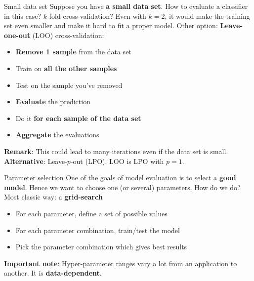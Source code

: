 \documentclass{beamer}
\newcommand{\1}[1]{\mathbbm{1}\left[#1\right]}
\begin{document}
\begin{frame}{Small data set}
Suppose you have \textbf{a small data set}. How to evaluate a classifier in this case?
\vfill
\pause
$k$-fold cross-validation? Even with $k = 2$, it would make the training set even smaller and make it hard to fit a proper model.
\vfill
\pause
Other option: \textbf{Leave-one-out} (LOO) cross-validation:
\pause
\begin{itemize}
	\item \textbf{Remove 1 sample} from the data set
	\item Train on \textbf{all the other samples}
	\item Test on the sample you've removed
	\item \textbf{Evaluate} the prediction
	\item Do it \textbf{for each sample of the data set}
	\item \textbf{Aggregate} the evaluations
\end{itemize}
\pause
\vfill
\textbf{Remark}: This could lead to many iterations even if the data set is small.
\pause
\vfill
\textbf{Alternative}: Leave-$p$-out (LPO). LOO is LPO with $p = 1$.
\end{frame}

\begin{frame}{Parameter selection}
One of the goals of model evaluation is to select a \textbf{good model}.
\vfill
\pause
Hence we want to choose one (or several) parameters. How do we do?
\vfill
\pause
Most classic way: a \textbf{grid-search}
\begin{itemize}
	\item For each parameter, define a set of possible values
	\item For each parameter combination, train/test the model
	\item Pick the parameter combination which gives best results
\end{itemize}
\vfill
\pause
\textbf{Important note}: Hyper-parameter ranges vary a lot from an application to another. It is \textbf{data-dependent}.
\end{frame}
\end{document}
